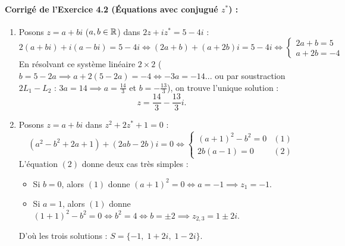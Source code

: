 \paragraph{Corrigé de l'Exercice 4.2 (Équations avec conjugué $z^*$) :}
\begin{enumerate}[label=(\alph*)]
    \item Posons $z = a + bi$ ($a, b \in \mathbb{R}$) dans $2z + iz^* = 5 - 4i$ :
    \[
        2(a + bi) + i(a - bi) = 5 - 4i \iff (2a + b) + (a + 2b)i = 5 - 4i \iff \begin{cases} 2a + b = 5 \\ a + 2b = -4 \end{cases}
    \]
    En résolvant ce système linéaire $2 \times 2$ ($b = 5 - 2a \implies a + 2(5 - 2a) = -4 \iff -3a = -14$... ou par soustraction $2L_1 - L_2$ : $3a = 14 \implies a = \frac{14}{3}$ et $b = -\frac{13}{3}$), on trouve l'unique solution :
    \[
        \boxed{z = \frac{14}{3} - \frac{13}{3}i}.
    \]
    \item Posons $z = a + bi$ dans $z^2 + 2z^* + 1 = 0$ :
    \[
        (a^2 - b^2 + 2a + 1) + (2ab - 2b)i = 0 \iff \begin{cases} (a + 1)^2 - b^2 = 0 & (1) \\ 2b(a - 1) = 0 & (2) \end{cases}
    \]
    L'équation $(2)$ donne deux cas très simples :
    \begin{itemize}
        \item Si $b = 0$, alors $(1)$ donne $(a + 1)^2 = 0 \iff a = -1 \implies z_1 = -1$.
        \item Si $a = 1$, alors $(1)$ donne $(1 + 1)^2 - b^2 = 0 \iff b^2 = 4 \iff b = \pm 2 \implies z_{2,3} = 1 \pm 2i$.
    \end{itemize}
    D'où les trois solutions : $\boxed{S = \{-1,\; 1 + 2i,\; 1 - 2i\}}$.
\end{enumerate}

